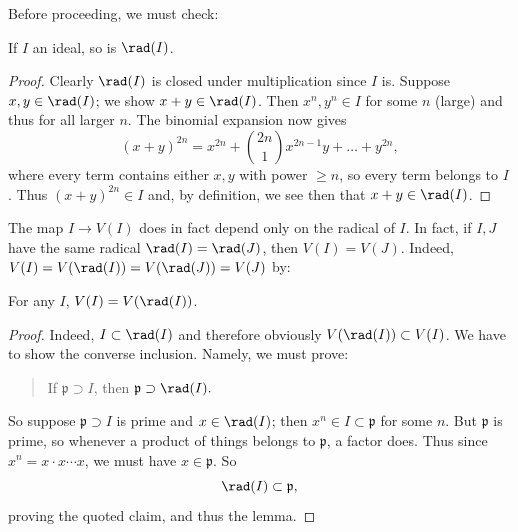 Before proceeding, we must check:
\begin{lemma} 
If $I$ an ideal, so is $\rad(I)$.
\end{lemma} 
\begin{proof} 
Clearly $\rad(I)$ is closed under multiplication since $I$ is.
Suppose $x,y \in \rad(I)$; we show $x+y \in \rad(I)$. Then $x^n,
y^n \in I$
for some $n$ (large) and thus for all larger $n$. The binomial
expansion now
gives
\[ (x+y)^{2n} = x^{2n} + \binom{2n}{1} x^{2n-1}y + \dots +
y^{2n}, \]
where every term contains either $x,y$ with power $ \geq n$, so
every term
belongs to $I$. Thus $(x+y)^{2n} \in I$ and, by definition, we
see then that $x+y \in \rad(I)$.
\end{proof} 

The map $I \to V(I)$ does in fact depend only on the radical of
$I$. In fact, if $I,J$ have the same radical $\rad(I) =
\rad(J)$, then $V(I) = V(J)$.
Indeed, $V(I) = V(\rad(I)) = V(\rad(J)) = V(J)$ by:
\begin{lemma} 
For any $I$, $V(I) = V(\rad(I))$.
\end{lemma} 
\begin{proof} 
Indeed, $I \subset \rad(I)$ and therefore obviously $V(\rad(I))
\subset V(I)$. We have to show the
converse inclusion. Namely, we must prove:
\begin{quote}
If $\mathfrak{p} \supset I$, then $\mathfrak{p} \supset
\rad(I).$
\end{quote}
So suppose $\mathfrak{p} \supset I$ is prime and $x \in
\rad(I)$; then $x^n \in I \subset \mathfrak{p}$ for some $n$.
But $\mathfrak{p}$ is prime, so whenever a product of things
belongs to
$\mathfrak{p}$, a factor does. Thus since $x^n = x \cdot x
\cdots x$, we must
have $x \in \mathfrak{p}$. So
\[ \rad(I) \subset \mathfrak{p},  \]
proving the quoted claim, and thus the lemma.
\end{proof} 

